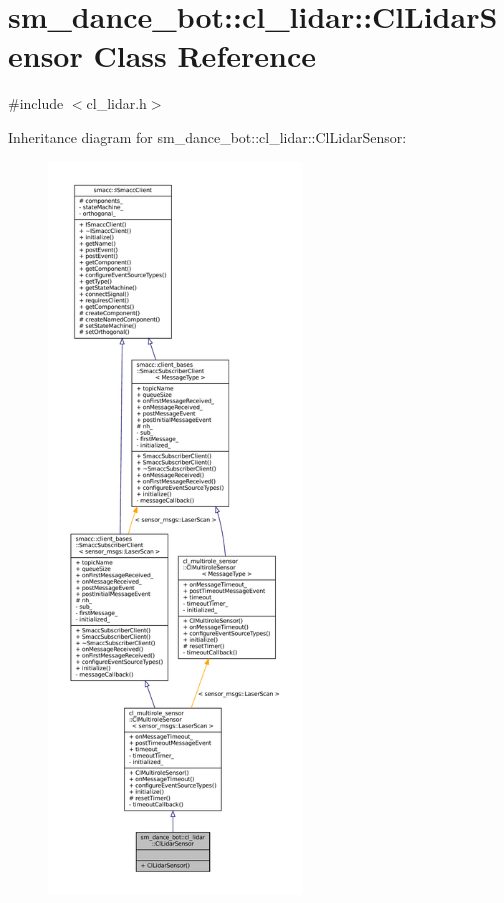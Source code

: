 \hypertarget{classsm__dance__bot_1_1cl__lidar_1_1ClLidarSensor}{}\section{sm\+\_\+dance\+\_\+bot\+:\+:cl\+\_\+lidar\+:\+:Cl\+Lidar\+Sensor Class Reference}
\label{classsm__dance__bot_1_1cl__lidar_1_1ClLidarSensor}


{\ttfamily \#include $<$cl\+\_\+lidar.\+h$>$}



Inheritance diagram for sm\+\_\+dance\+\_\+bot\+:\+:cl\+\_\+lidar\+:\+:Cl\+Lidar\+Sensor\+:
\nopagebreak
\begin{figure}[H]
\begin{center}
\leavevmode
\includegraphics[height=550pt]{classsm__dance__bot_1_1cl__lidar_1_1ClLidarSensor__inherit__graph}
\end{center}
\end{figure}


